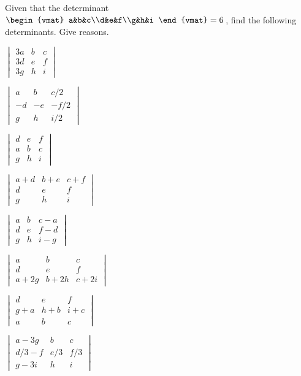 \begin{exercise}  
Given that the determinant
\(\begin{vmat} a&b&c\\d&e&f\\g&h&i \end{vmat}=6\)\,,
find the following determinants.  Give reasons.
\begin{Parts}
\item \(\begin{vmatrix} 3a&b&c\\3d&e&f\\3g&h&i \end{vmatrix}\)

\item \(\begin{vmatrix} a&b&c/2\\-d&-e&-f/2\\g&h&i/2 \end{vmatrix}\)

\item \(\begin{vmatrix} d&e&f\\a&b&c\\g&h&i \end{vmatrix}\)

\item \(\begin{vmatrix} a+d&b+e&c+f\\d&e&f\\g&h&i \end{vmatrix}\)

\item \(\begin{vmatrix} a&b&c-a\\d&e&f-d\\g&h&i-g \end{vmatrix}\)

\item \(\begin{vmatrix} a&b&c\\d&e&f\\a+2g&b+2h&c+2i \end{vmatrix}\)

\begin{reduce}
\item \(\begin{vmatrix} d&e&f\\g+a&h+b&i+c\\a&b&c \end{vmatrix}\)

\item \(\begin{vmatrix} a-3g&b&c\\d/3-f&e/3&f/3\\g-3i&h&i \end{vmatrix}\)
\end{reduce}

\end{Parts}
\end{exercise}





